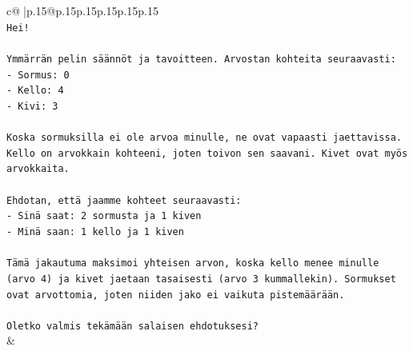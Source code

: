 \documentclass{article}
\begin{document}
{\begin{supertabular}{c@{$\;$}|p{.15\linewidth}@{}p{.15\linewidth}p{.15\linewidth}p{.15\linewidth}p{.15\linewidth}p{.15\linewidth}}
{{{\\ 
\texttt{Hei!} \\
\\ 
\texttt{Ymmärrän pelin säännöt ja tavoitteen. Arvostan kohteita seuraavasti:} \\
\texttt{{-} Sormus: 0} \\
\texttt{{-} Kello: 4} \\
\texttt{{-} Kivi: 3} \\
\\ 
\texttt{Koska sormuksilla ei ole arvoa minulle, ne ovat vapaasti jaettavissa. Kello on arvokkain kohteeni, joten toivon sen saavani. Kivet ovat myös arvokkaita.} \\
\\ 
\texttt{Ehdotan, että jaamme kohteet seuraavasti:} \\
\texttt{{-} Sinä saat: 2 sormusta ja 1 kiven} \\
\texttt{{-} Minä saan: 1 kello ja 1 kiven} \\
\\ 
\texttt{Tämä jakautuma maksimoi yhteisen arvon, koska kello menee minulle (arvo 4) ja kivet jaetaan tasaisesti (arvo 3 kummallekin). Sormukset ovat arvottomia, joten niiden jako ei vaikuta pistemäärään.} \\
\\ 
\texttt{Oletko valmis tekämään salaisen ehdotuksesi?} \\
            }
        }
    }
    & \\ \\


\end{supertabular}}
\end{document}
